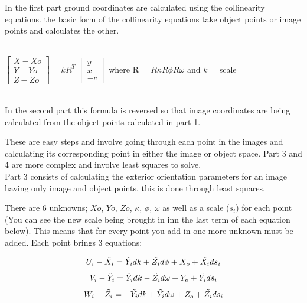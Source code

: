 \documentclass[12pt,a4paper]{article}
\begin{document}
	In the first part ground coordinates are calculated using the collinearity equations. the basic form of the collinearity equations take object points or image points and calculates the other.\\
	\\
	
	
	\centerline{
	$
	\begin{bmatrix}
		X - Xo \\ 
		Y - Yo \\ 
		Z - Zo
	\end{bmatrix}= kR^T$
	$
	\begin{bmatrix}
		y \\ 
		x \\ 
		-c
	\end{bmatrix}
	$
	where R = $R\kappa R\phi R\omega$ and $k$ = scale\\}
	~\\
	
	In the second part this formula is reversed so that image coordinates are being calculated from the object points calculated in part 1.
	
	These are easy steps and involve going through each point in the images and calculating its corresponding point in either the image or object space. Part 3 and 4 are more complex and involve least squares to solve.\\
	
	Part 3 consists of calculating the exterior orientation parameters for an image having only image and object points. this is done through least squares. 
	
	There are 6 unknowns; $Xo$, $Yo$, $Zo$, $\kappa$, $\phi$, $\omega$ as well as a scale ($s_i$) for each point (You can see the new scale being brought in inn the last term of each equation below). This means that for every point you add in one more unknown must be added. Each point brings 3 equations:
	
	\begin{equation}\notag
	U_i - \tilde{X_i} = \tilde{Y_i} dk + \tilde{Z_i}d\phi + X_o + \tilde{X_i}ds_i
	\end{equation}
	\begin{equation}\notag
	V_i - \tilde{Y_i} = \tilde{Y_i} dk - \tilde{Z_i}d\omega + Y_o + \tilde{Y_i}ds_i
	\end{equation}
	\begin{equation}\notag
	W_i - \tilde{Z_i} = -\tilde{Y_i} dk + \tilde{Y_i}d\omega + Z_o + \tilde{Z_i}ds_i
	\end{equation}
	
\end{document}
